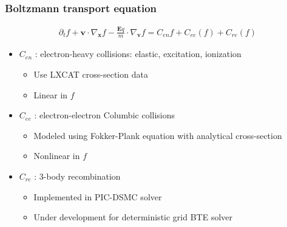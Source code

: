\documentclass[mathserif, aspectratio=169]{beamer}
\newcommand{\vect}[1]{\boldsymbol{#1}}
\newcommand{\myint}{\int\limits}
\newcommand{\diff}[1]{\, d#1}
\begin{document}
\begin{frame}
	\frametitle{Boltzmann transport equation}
	\begin{align}
		\partial_t f  + \vect{v} \cdot \nabla_{\vect{x}} f -\frac{\vect{E} q}{m} \cdot \nabla_{\vect{v }}f = C_{en}f + C_{ee}(f) + C_{re}(f)
	\end{align}
	\begin{itemize}
		\item $C_{en}$ : electron-heavy collisions: elastic, excitation, ionization
		\begin{itemize}
			\item Use LXCAT cross-section data 
			\item Linear in $f$
		\end{itemize} 
		\item $C_{ee}$ : electron-electron Columbic collisions 
		\begin{itemize}
			\item Modeled using Fokker-Plank equation with analytical cross-section
			\item Nonlinear in $f$
		\end{itemize}
		\item $C_{re}$ : 3-body recombination 
		\begin{itemize}
			\item Implemented in PIC-DSMC solver
			\item Under development for deterministic grid BTE solver
		\end{itemize}
	\end{itemize}
\end{frame}
\end{document}
